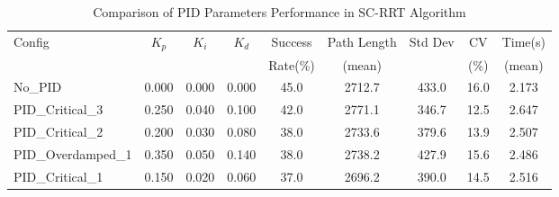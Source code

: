 
\begin{table}[htbp]
\centering
\caption{Comparison of PID Parameters Performance in SC-RRT Algorithm}
\label{tab:pid_comparison}
\begin{tabular}{lcccccccc}
\hline
Config & $K_p$ & $K_i$ & $K_d$ & Success & Path Length & Std Dev & CV & Time(s) \\
 & & & & Rate(\%) & (mean) & & (\%) & (mean) \\
\hline
No\_PID & 0.000 & 0.000 & 0.000 & 45.0 & 2712.7 & 433.0 & 16.0 & 2.173 \\
PID\_Critical\_3 & 0.250 & 0.040 & 0.100 & 42.0 & 2771.1 & 346.7 & 12.5 & 2.647 \\
PID\_Critical\_2 & 0.200 & 0.030 & 0.080 & 38.0 & 2733.6 & 379.6 & 13.9 & 2.507 \\
PID\_Overdamped\_1 & 0.350 & 0.050 & 0.140 & 38.0 & 2738.2 & 427.9 & 15.6 & 2.486 \\
PID\_Critical\_1 & 0.150 & 0.020 & 0.060 & 37.0 & 2696.2 & 390.0 & 14.5 & 2.516 \\
\hline
\end{tabular}
\end{table}

